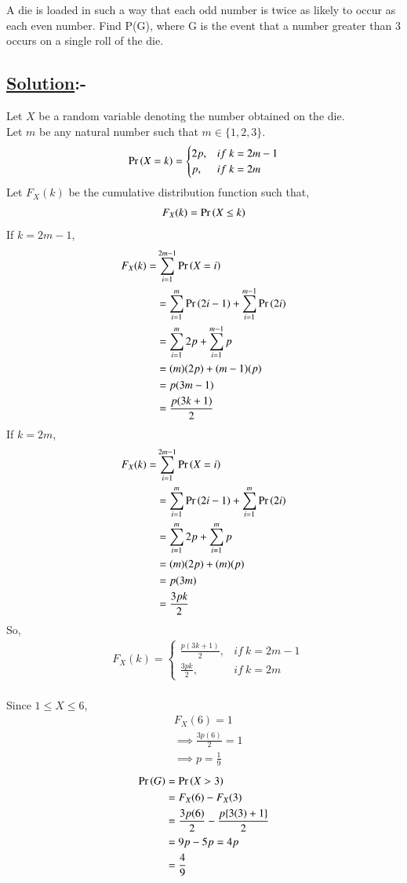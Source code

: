 \documentclass[journal,12pt,twocolumn]{IEEEtran}
\begin{document}
A die is loaded in such a way that each odd number is twice as likely to occur as
each even number. Find P(G), where G is the event that a number greater than
3 occurs on a single roll of the die.

\subsection*{\textbf{\underline{Solution}:-}}

Let $X$ be a random variable denoting the number 
obtained on the die.\\

Let $m$ be any natural number such that $m\in\{1,2,3\}$.\\ 
\begin{align}
\Pr\left(X=k\right)= \begin{cases} 
      2p, & if\ k=2m-1 \\
      p, & if\ k=2m 
   \end{cases}
\end{align}
Let $F_X (k)$ be the cumulative distribution function such that,\\
\begin{align}
    F_X (k) = \Pr\left(X\leq k\right)
\end{align}
If $k = 2m-1$,
\begin{align}
    F_X (k) = &\sum_{i=1}^{2m-1}{\Pr\left(X=i\right)}
\\
    &= \sum_{i=1}^{m}{\Pr\left(2i-1\right)} + \sum_{i=1}^{m-1}{\Pr\left(2i\right)}\\
    &= \sum_{i=1}^{m}{2p} + \sum_{i=1}^{m-1}{p}\\
    &= (m)(2p) + (m-1)(p)\\
    &= p(3m-1)\\
    &= \frac{p(3k+1)}{2}
\end{align}
If $k = 2m$,
\begin{align}
    F_X (k) = &\sum_{i=1}^{2m-1}{\Pr\left(X=i\right)}
\\
    &= \sum_{i=1}^{m}{\Pr\left(2i-1\right)} + \sum_{i=1}^{m}{\Pr\left(2i\right)}\\
    &=\sum_{i=1}^{m}{2p} + \sum_{i=1}^{m}{p}\\
    &= (m)(2p) + (m)(p)\\
    &= p(3m)\\
    &= \frac{3pk}{2}
\end{align}
So,
\begin{align}
&F_X (k)= \begin{cases} 
      \frac{p(3k+1)}{2}, & if\ k=2m-1 \\
      \frac{3pk}{2}, & if\ k=2m 
   \end{cases}
\end{align}\\
Since $1\leq X \leq6$,
\begin{align}
&F_X (6) = 1\\
&\implies \frac{3p(6)}{2} = 1\\
&\implies p = \frac{1}{9}
\end{align}
\begin{align}
  \Pr\left(G\right) &= \Pr\left(X>3\right)\\
  &=F_X (6) - F_X (3)\\
  &=\frac{3p(6)}{2} - \frac{p\{3(3)+1\}}{2}\\
  &= 9p - 5p = 4p\\
  &= \frac{4}{9}
  \end{align}
\end{document}
